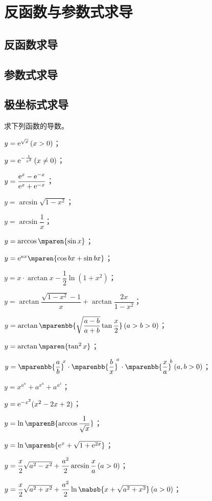 \section{反函数与参数式求导}
\subsection{反函数求导}
\subsection{参数式求导}
\subsection{极坐标式求导}
\begin{exercise}
\item 求下列函数的导数。
\begin{exlistcols}
  \item $y=\me^{\sqrt x}\mcond{x>0}$；
  \item $y=\me^{-\frac1{x^2}}\mcond{x\neq0}$；
  \item $y=\dfrac{\mathrm e^x-\mathrm e^{-x}}{\mathrm e^x+\mathrm e^{-x}}$；
  \item $y=\arcsin\sqrt{1-x^2}$；
  \item $y=\arcsin\dfrac1x$；
  \item $y=\arccos\mparen{\sin x}$；
  \item $y=\me^{ax}\mparen{\cos bx+\sin bx}$；
  \item $y=x\cdot\arctan x-\dfrac12\ln(1+x^2)$；
  \item $y=\arctan\dfrac{\sqrt{1-x^2}-1}x+\arctan\dfrac{2x}{1-x^2}$；
  \item $y=\arctan\mparenbb{\sqrt{\dfrac{a-b}{\smash[b]{a+b}}}\tan\dfrac x2}\mcond{a>b>0}$；
  \item $y=\arctan\mparen{\tan^2x}$；
  \item $y=\mparenbb{\dfrac ab}^{\msp x}\cdot\mparenbb{\dfrac bx}^{\msp a}\cdot\mparenbb{\dfrac xa}^{\msp b}\mcond{a,b>0}$；
  \item $y=x^{a^a}+a^{x^a}+a^{a^x}$；
  \item $y=\mathrm e^{-x^2}(x^2-2x+2)$；
  \item $y=\ln\mparenB{\arccos\dfrac1{\sqrt x}}$；
  \item $y=\ln\mparenb{\me^x+\sqrt{1+\me^{2x}}}$；
  \item $y=\dfrac x2\sqrt{a^2-x^2}+\dfrac{a^2}2\arcsin\dfrac xa\mcond{a>0}$；
  \item $y=\dfrac x2\sqrt{a^2+x^2}+\dfrac{a^2}2\ln\mabsb{x+\sqrt{a^2+x^2}}\mcond{a>0}$；

\end{exlistcols}
\end{exercise}
